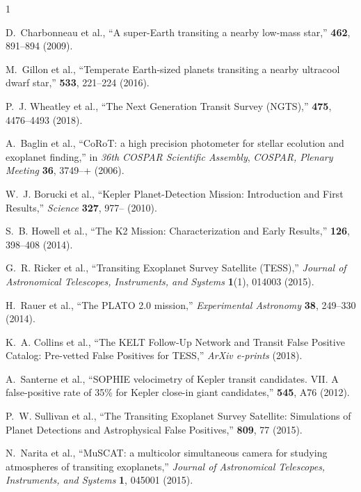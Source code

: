 \documentclass[a4paper,12pt]{spieman}  %
\begin{document}
\begin{spacing}{1}
\begin{thebibliography}{}
D.~{Charbonneau} et al., ``{A super-Earth
  transiting a nearby low-mass star},'' {\em \nat} {\bf 462}, 891--894  (2009).

M.~{Gillon} et al., ``{Temperate Earth-sized planets transiting a
  nearby ultracool dwarf star},'' {\em \nat} {\bf 533}, 221--224  (2016).

P.~J. {Wheatley} et al., ``{The Next Generation Transit
  Survey (NGTS)},'' {\em \mnras} {\bf 475}, 4476--4493  (2018).

A.~{Baglin} et al.,  ``{CoRoT: a high
  precision photometer for stellar ecolution and exoplanet finding},'' in {\em
  36th COSPAR Scientific Assembly},  {\em COSPAR, Plenary Meeting} {\bf 36},
  3749--+  (2006).

W.~J. {Borucki} et al., ``{Kepler Planet-Detection Mission: Introduction
  and First Results},'' {\em Science} {\bf 327}, 977--  (2010).

S.~B. {Howell} et al., ``{The K2
  Mission: Characterization and Early Results},'' {\em \pasp} {\bf 126},
  398--408  (2014).

G.~R. {Ricker} et al., ``{Transiting Exoplanet Survey Satellite (TESS)},'' {\em
  Journal of Astronomical Telescopes, Instruments, and Systems} {\bf 1}(1),
  014003  (2015).

H.~{Rauer} et al., ``{The PLATO 2.0 mission},'' {\em Experimental Astronomy}
  {\bf 38}, 249--330  (2014).

K.~A. {Collins} et al., ``{The KELT Follow-Up
  Network and Transit False Positive Catalog: Pre-vetted False Positives for
  TESS},'' {\em ArXiv e-prints}   (2018).

A.~{Santerne} et al., ``{SOPHIE
  velocimetry of Kepler transit candidates. VII. A false-positive rate of 35\%
  for Kepler close-in giant candidates},'' {\em \aap} {\bf 545}, A76  (2012).

P.~W. {Sullivan} et al., 
  ``{The Transiting Exoplanet Survey Satellite: Simulations of Planet
  Detections and Astrophysical False Positives},'' {\em \apj} {\bf 809}, 77
  (2015).

N.~{Narita} et al., ``{MuSCAT: a
  multicolor simultaneous camera for studying atmospheres of transiting
  exoplanets},'' {\em Journal of Astronomical Telescopes, Instruments, and
  Systems} {\bf 1}, 045001  (2015).


\end{thebibliography}
\end{spacing}
\end{document}
